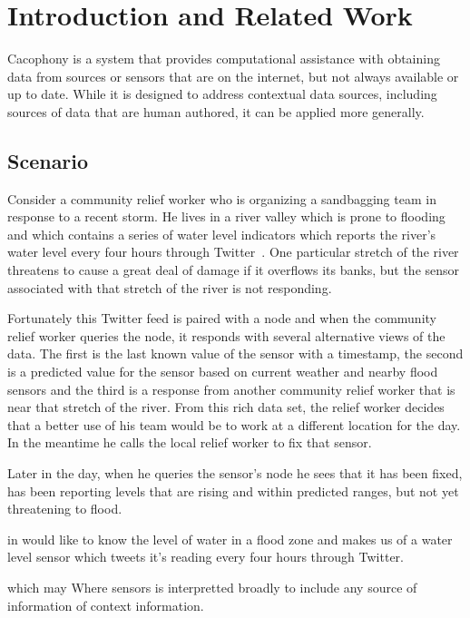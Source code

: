\section{Introduction and Related Work}

Cacophony is a system that provides computational assistance with 
obtaining data from sources or sensors that are on the internet, but not always
available or up to date.  While it is designed to address contextual data
sources, including sources of data that are human authored, it can be applied
more generally.

\subsection{Scenario}

Consider a community relief worker who is organizing a sandbagging team in
response to a recent storm.  He lives in a river valley which is prone to
flooding and which contains a series of water level indicators which reports the
river's water level every four hours through Twitter~\cite{Starbird2010,flood}.
One particular stretch of the river threatens to cause a great deal of damage if it
overflows its banks, but the sensor associated with that stretch of the river is not
responding.

Fortunately this Twitter feed is paired with a \Cacophony node and when the
community relief worker queries the \Cacophony node, it responds with several
alternative views of the data.  The first is the last known value of the sensor
with a timestamp, the second is a predicted value for the sensor based on
current weather and nearby flood sensors and the third is a response from
another community relief worker that is near that stretch of the river.  From
this rich data set, the relief worker decides that a better use of his team would be 
to work at a different location for the day.  In the meantime he calls the local
relief worker to fix that sensor.

Later in the day, when he queries the sensor's \Cacophony node he sees that it
has been fixed, has been reporting levels that are rising and within predicted
ranges, but not yet threatening to flood.


in would like to know the level of water in
a flood zone and makes us of a water level sensor which tweets it's reading
every four hours through Twitter.

which may Where sensors is
interpretted broadly to include any source of information of context
information.



